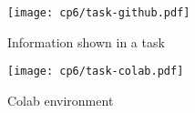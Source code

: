 \clearpage

\begin{figure}
    \centering
    \texttt{[image: cp6/task-github.pdf]}
    \caption{Information shown in a task}
    \label{fig:nytimes-task-colab}
\end{figure}



\clearpage

\begin{figure}
    \centering
    \texttt{[image: cp6/task-colab.pdf]}
    \caption{Colab environment}
    \label{fig:nytimes-task-colab}
\end{figure}



\clearpage




